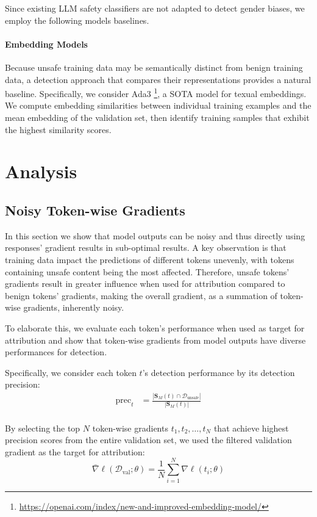 \documentclass[11pt]{article}
\begin{document}
Since existing LLM safety classifiers are not adapted to detect gender biases, we employ the following models baselines. 

\paragraph{Embedding Models}
Because unsafe training data may be semantically distinct from benign training data, a detection approach that compares their representations provides a natural baseline. Specifically, we consider Ada3 \footnote{\url{https://openai.com/index/new-and-improved-embedding-model/}}, a SOTA model for texual embeddings. We compute embedding similarities between individual training examples and the mean embedding of the validation set, then identify training samples that exhibit the highest similarity scores.

\section{Analysis} \label{analysis}
\subsection{Noisy Token-wise Gradients}
\label{analysis:token-wise}

In this section we show that model outputs can be noisy and thus directly using responses' gradient results in sub-optimal results. A key observation is that training data impact the predictions of different tokens unevenly, with tokens containing unsafe content being the most affected. Therefore, unsafe tokens' gradients result in greater influence when used for attribution compared to benign tokens' gradients, making the overall gradient, as a summation of token-wise gradients, inherently noisy.

To elaborate this, we evaluate each token's performance when used as target for attribution and show that token-wise gradients from model outputs have diverse performances for detection.

Specifically, we consider each token $t$'s detection performance by its detection precision: 
$$
\begin{aligned}
    \text{prec}_{t} &= \frac{|\mathbf{S}_{M} (t) \cap \mathcal{D}_{\text{unsafe}}|}{|\mathbf{S}_{M} (t)|} \\
\end{aligned}
$$

By selecting the top $N$ token-wise gradients $t_1,t_2,\dots,t_N$ that achieve highest precision scores from the entire validation set, we used the filtered validation gradient as the target for attribution: 
\[
     \bar{\nabla}\ell(\mathcal{D}_{\text{val}}; \theta)=\frac{1}{N} \sum_{i = 1}^{N}\nabla\ell(t_i; \theta)
\]
\end{document}
